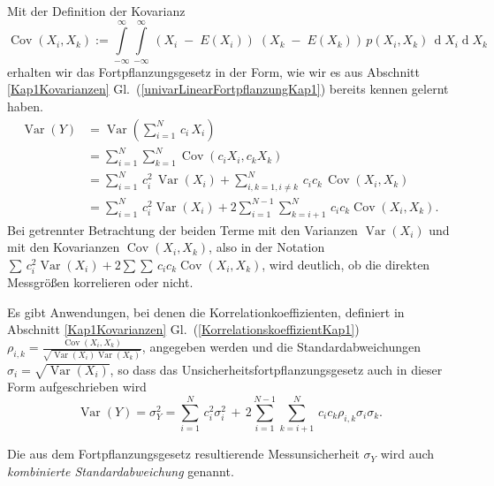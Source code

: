 Mit der Definition der Kovarianz
$$
\operatorname {Cov}(X_{i},X_{k}) :=
\int\limits_{-\infty}^{\infty} \int\limits_{-\infty}^{\infty}
\, \left(X_i \; - \; E(X_i)\right) \;
      \left(X_k \; - \; E(X_k)\right) \, p(X_i, X_k)
\, \operatorname{d}X_i \operatorname{d}X_k
$$
erhalten wir das Fortpflanzungsgesetz in der Form, wie wir es aus Abschnitt \ref{Kap1Kovarianzen}
Gl.~(\ref{univarLinearFortpflanzungKap1}) bereits kennen gelernt haben.
\begin{equation}
{\begin{aligned}
\operatorname {Var}\left(Y\right) & =
\operatorname {Var}\left(\sum _{{i=1}}^{N} \, c_i \, X_{i}\right) \\
 & = \sum _{i=1}^{N}\sum _{k=1}^{N}\operatorname {Cov}(c_i X_{i}, c_k X_{k})\\
 & = \sum _{{i=1}}^{N} \, c_i^2 \, \operatorname {Var}(X_{i})+
     \sum _{{i,k=1,i\neq k}}^{N} \, c_i c_k \,  \operatorname {Cov}(X_{i},X_{k})\\
& = \sum _{{i=1}}^{N} \, c_i^2 \operatorname {Var}(X_{i})+2\sum _{{i=1}}^{{N-1}}
  \sum _{{k=i+1}}^{N} \, c_i c_k \operatorname {Cov}(X_{i},X_{k}).
\end{aligned}}
\label{univarLinearFortpflanzungKap7}
\end{equation}
Bei getrennter Betrachtung der beiden Terme mit den Varianzen $\operatorname {Var}(X_{i})$
und mit den Kovarianzen $\operatorname {Cov}(X_{i},X_{k})$, also
in der Notation $\sum \, c_i^2 \operatorname {Var}(X_{i})+2\sum
 \sum \, c_i c_k \operatorname {Cov}(X_{i},X_{k})$, wird deutlich, ob
die direkten Messgrößen korrelieren oder nicht.

Es gibt Anwendungen, bei denen die Korrelationkoeffizienten, definiert in
Abschnitt \ref{Kap1Kovarianzen} Gl.~(\ref{KorrelationskoeffizientKap1})
$\rho_{i,k} = \frac{\operatorname {Cov}(X_{i},X_{k})}{\sqrt{\operatorname {Var}(X_{i}) \operatorname {Var}(X_{k})}}$,
angegeben werden und die Standardabweichungen $\sigma_i = \sqrt{\operatorname {Var}(X_{i})}$, so dass
das Unsicherheitsfortpflanzungsgesetz auch in dieser Form aufgeschrieben wird
\begin{equation}
\operatorname {Var}\left(Y\right) = \sigma_Y^2  =
\sum _{{i=1}}^{N} \, c_i^2 \sigma_i^2 \, + \, 2\sum _{{i=1}}^{{N-1}}
  \sum _{{k=i+1}}^{N} \, c_i c_k \rho_{i,k} \sigma_i \sigma_k .
\label{FortpflaKorrStd}
\end{equation}

Die aus dem Fortpflanzungsgesetz resultierende Messunsicherheit $\sigma_Y$ wird auch
\textsl{kombinierte Standardabweichung} genannt.

